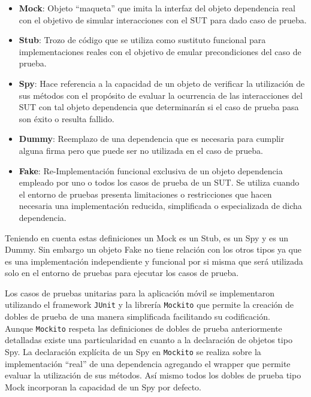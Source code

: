\begin{itemize}
	\item \textbf{Mock}: Objeto ``maqueta'' que imita la interfaz del objeto dependencia real con el objetivo de simular interacciones con el SUT para dado caso de prueba.
	\item \textbf{Stub}: Trozo de código que se utiliza como sustituto funcional para implementaciones reales con el objetivo de emular precondiciones del caso de prueba.
	\item \textbf{Spy}: Hace referencia a la capacidad de un objeto de verificar la utilización de sus métodos con el propósito de evaluar la ocurrencia de las interacciones del SUT con tal objeto dependencia que determinarán si el caso de prueba pasa son éxito o resulta fallido.
	\item \textbf{Dummy}: Reemplazo de una dependencia que es necesaria para cumplir alguna firma pero que puede ser no utilizada en el caso de prueba.
	\item \textbf{Fake}: Re-Implementación funcional exclusiva de un objeto dependencia empleado por uno o todos los casos de prueba de un SUT. Se utiliza cuando el entorno de pruebas presenta limitaciones o restricciones que hacen necesaria una implementación reducida, simplificada o especializada de dicha dependencia. 
\end{itemize}

Teniendo en cuenta estas definiciones un Mock es un Stub, es un Spy y es un Dummy. 
Sin embargo un objeto Fake no tiene relación con los otros tipos ya que es una implementación independiente y funcional por si misma que será utilizada solo en el entorno de pruebas para ejecutar los casos de prueba.

Los casos de pruebas unitarias para la aplicación móvil se implementaron utilizando el framework \texttt{JUnit} y la librería \texttt{Mockito} que permite la creación de dobles de prueba de una manera simplificada facilitando su codificación.\\
Aunque \texttt{Mockito} respeta las definiciones de dobles de prueba anteriormente detalladas existe una particularidad en cuanto a la declaración de objetos tipo Spy. La declaración explícita de un Spy en \texttt{Mockito} se realiza sobre la implementación ``real'' de una dependencia agregando el wrapper que permite evaluar la utilización de sus métodos. Así mismo todos los dobles de prueba tipo Mock incorporan la capacidad de un Spy por defecto.

